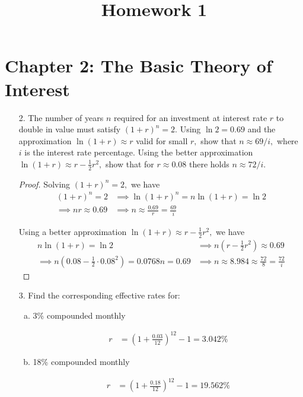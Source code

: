 \documentclass{article}
\begin{document}
\title{Homework 1}
\maketitle
\thispagestyle{fancy}

\section*{Chapter 2: The Basic Theory of Interest}

\begin{itemize}
	\item[2.] The number of years $n$ required for an investment at interest rate $r$ to double in value must satisfy $(1+r)^n=2.$ Using $\ln 2 = 0.69$ and the approximation $\ln(1+r)\approx r$ valid for small $r,$ show that $n\approx 69/i,$ where $i$ is the interest rate percentage. Using the better approximation $\ln(1+r)\approx r-\frac{1}{2}r^2,$ show that for $r\approx 0.08$ there holds $n\approx 72/i.$
		\begin{proof}
			Solving $(1+r)^n=2,$ we have
			\begin{align*}
				(1+r)^n = 2 &\implies \ln(1+r)^n = n\ln (1+r)= \ln 2 \\
				\implies nr\approx 0.69 &\implies n \approx \frac{0.69}{r} = \frac{69}{i}
			\end{align*}

			Using a better approximation $\ln(1+r)\approx r-\frac{1}{2}r^2,$ we have
			\begin{align*}
				n\ln(1+r) = \ln 2 &\implies n\left( r-\frac{1}{2}r^2 \right)\approx 0.69 \\
				\implies n\left( 0.08-\frac{1}{2}\cdot 0.08^2 \right) = 0.0768n = 0.69 &\implies n \approx 8.984 \approx \frac{72}{8} = \frac{72}{i}
			\end{align*}
		\end{proof}

	\item[3.] Find the corresponding effective rates for:
		\begin{enumerate}[(a)]
			\item 3\% compounded monthly
				\begin{answer*}
					\begin{align*}
						r &= \left( 1+\frac{0.03}{12} \right)^{12} - 1 = 3.042\%
					\end{align*}
				\end{answer*}

			\item 18\% compounded monthly
				\begin{answer*}
					\begin{align*}
						r &= \left( 1+\frac{0.18}{12} \right)^{12} - 1 = 19.562\%
					\end{align*}
				\end{answer*}


\end{enumerate}
\end{itemize}
\end{document}
